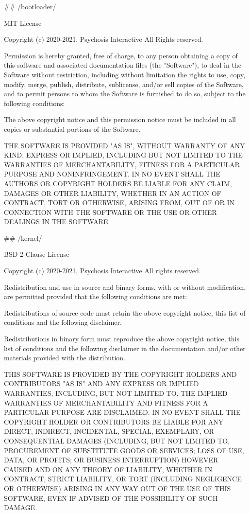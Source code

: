 \#\# /bootloader/ 
\begin{DoxyCode}
MIT License

Copyright (c) 2020-2021, Psychosis Interactive All Rights reserved.

Permission is hereby granted, free of charge, to any person obtaining a copy of this software and
       associated documentation files (the "Software"), to deal in the Software without restriction, including without
       limitation the rights to use, copy, modify, merge, publish, distribute, sublicense, and/or sell copies of the
       Software, and to permit persons to whom the Software is furnished to do so, subject to the following
       conditions:

The above copyright notice and this permission notice must be included in all copies or substantial
       portions of the Software.

THE SOFTWARE IS PROVIDED "AS IS", WITHOUT WARRANTY OF ANY KIND, EXPRESS OR IMPLIED, INCLUDING BUT NOT
       LIMITED TO THE WARRANTIES OF MERCHANTABILITY, FITNESS FOR A PARTICULAR PURPOSE AND NONINFRINGEMENT. IN NO EVENT
       SHALL THE AUTHORS OR COPYRIGHT HOLDERS BE LIABLE FOR ANY CLAIM, DAMAGES OR OTHER LIABILITY, WHETHER IN AN
       ACTION OF CONTRACT, TORT OR OTHERWISE, ARISING FROM, OUT OF OR IN CONNECTION WITH THE SOFTWARE OR THE USE OR
       OTHER DEALINGS IN THE SOFTWARE.
\end{DoxyCode}
 \#\# /kernel/ 
\begin{DoxyCode}
BSD 2-Clause License

Copyright (c) 2020-2021, Psychosis Interactive All rights reserved.

Redistribution and use in source and binary forms, with or without modification, are permitted provided
       that the following conditions are met:

Redistributions of source code must retain the above copyright notice, this list of conditions and the
       following disclaimer.

Redistributions in binary form must reproduce the above copyright notice, this list of conditions and the
       following disclaimer in the documentation and/or other materials provided with the distribution.

THIS SOFTWARE IS PROVIDED BY THE COPYRIGHT HOLDERS AND CONTRIBUTORS "AS IS" AND ANY EXPRESS OR IMPLIED
       WARRANTIES, INCLUDING, BUT NOT LIMITED TO, THE IMPLIED WARRANTIES OF MERCHANTABILITY AND FITNESS FOR A
       PARTICULAR PURPOSE ARE DISCLAIMED. IN NO EVENT SHALL THE COPYRIGHT HOLDER OR CONTRIBUTORS BE LIABLE FOR ANY DIRECT,
       INDIRECT, INCIDENTAL, SPECIAL, EXEMPLARY, OR CONSEQUENTIAL DAMAGES (INCLUDING, BUT NOT LIMITED TO,
       PROCUREMENT OF SUBSTITUTE GOODS OR SERVICES; LOSS OF USE, DATA, OR PROFITS; OR BUSINESS INTERRUPTION) HOWEVER CAUSED
       AND ON ANY THEORY OF LIABILITY, WHETHER IN CONTRACT, STRICT LIABILITY, OR TORT (INCLUDING NEGLIGENCE OR
       OTHERWISE) ARISING IN ANY WAY OUT OF THE USE OF THIS SOFTWARE, EVEN IF ADVISED OF THE POSSIBILITY OF SUCH DAMAGE.
\end{DoxyCode}
